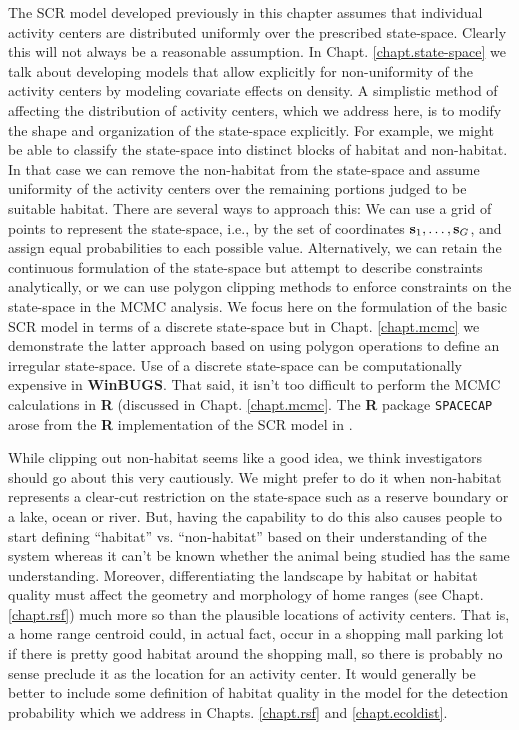 {{The SCR model developed previously in this chapter assumes that
individual activity centers are distributed uniformly over the
prescribed state-space. Clearly this will not always be a reasonable
assumption. In Chapt. \ref{chapt.state-space} we talk about developing
models that allow explicitly for non-uniformity of the activity
centers by modeling covariate effects on density. A simplistic method
of 
affecting the distribution of activity centers, which we address here,
is to modify the shape and organization of the state-space
explicitly. For example, we might be able to classify the state-space
into distinct blocks of habitat and non-habitat. In that case we can
remove the non-habitat from the state-space and assume uniformity of
the activity centers over the remaining portions judged to be suitable
habitat.  There are several ways to approach this: We can use a
 grid of points to represent the state-space, i.e., by the set
of coordinates ${\bf s}_1, \ldots, {\bf s}_{G}$, and assign equal
probabilities to each possible value. Alternatively, we can retain the
continuous formulation of the state-space but attempt to describe
constraints analytically, or we can use polygon clipping methods to
enforce constraints on the state-space in the MCMC analysis. We focus
here on the formulation of the basic SCR model in terms of a discrete
state-space but in Chapt. \ref{chapt.mcmc}
we demonstrate the latter approach based on using polygon
operations to define an irregular state-space.
Use of a discrete state-space can be computationally expensive in {\bf
  WinBUGS}. That said, it isn't too difficult to perform the MCMC
calculations in {\bf R} (discussed in Chapt.
\ref{chapt.mcmc}. The {\bf R} package {\tt SPACECAP}
\citep{gopalaswamy_etal:2012mee} arose from the {\bf R} implementation of
the SCR model in \citet{royle_etal:2009ecol}.  

While clipping out non-habitat seems like a good idea, we think
investigators should go about this very cautiously.  We might prefer
to do it when non-habitat represents a clear-cut restriction on the
state-space such as a reserve boundary or a lake, ocean or river. But,
having the capability to do this also causes people to start defining
``habitat'' vs. ``non-habitat'' based on their understanding of the
system whereas it can't be known whether the animal being studied has
the same understanding.  Moreover, differentiating the landscape by
habitat or habitat quality must affect the geometry and morphology of
home ranges (see Chapt. \ref{chapt.rsf}) much more so than the
plausible locations of activity centers. That is, a home range
centroid could, in actual fact, occur in a shopping mall parking lot if
there is pretty good habitat around the shopping mall, so there is probably no
sense preclude it as the location for
an activity center.  It would generally be better to include some
definition of habitat quality in the model for the detection
probability \citep{royle_etal:2012ecol} which we address in
Chapts. \ref{chapt.rsf} and \ref{chapt.ecoldist}.


}}
